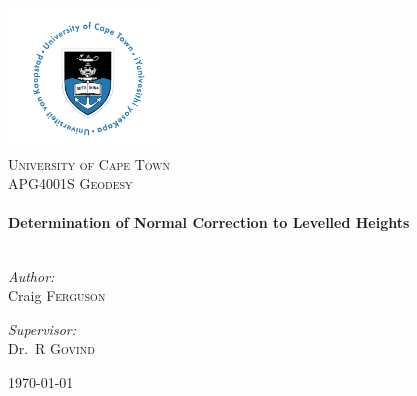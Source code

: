 \begin{titlepage} \begin{center} 
\includegraphics[width=0.3\textwidth]{./logo}~\\[1cm] \textsc{\LARGE University of Cape Town}\\[1.5cm] \textsc{\Large APG4001S Geodesy}\\[0.5cm] 
\HRule \\[0.4cm] { \huge \bfseries Determination of Normal Correction to Levelled Heights \\[0.4cm] } \HRule \\[1.5cm]
  \noindent \begin{minipage}[t]{0.4\textwidth} \begin{flushleft} \large \emph{Author:}\\ Craig \textsc{Ferguson} \end{flushleft} \end{minipage}
% 
  \begin{minipage}[t]{0.4\textwidth} \begin{flushright} \large \emph{Supervisor:} \\ Dr.~R \textsc{Govind} \end{flushright} \end{minipage} \vfill 
  {\large \today} \end{center} \end{titlepage}